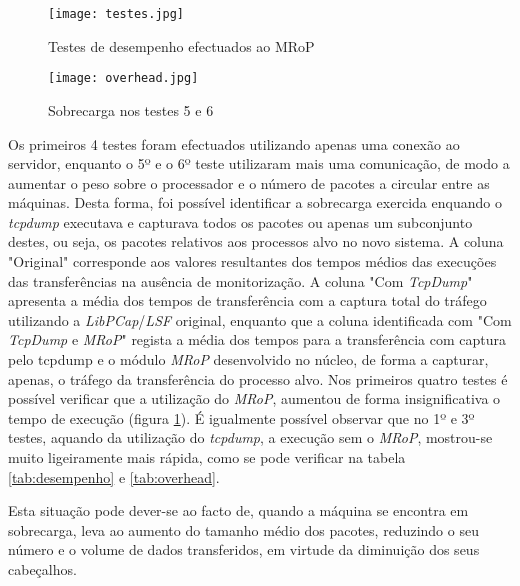 \begin{figure}[!ht]
\centering
\texttt{[image: testes.jpg]}
\caption{Testes de desempenho efectuados ao MRoP}
\label{fig:tests_graphics}
\end{figure}

\begin{figure}[!ht]
\centering
\texttt{[image: overhead.jpg]}
\caption{Sobrecarga nos testes 5 e 6 }
\label{fig:tests_overhead}
\end{figure}

Os primeiros 4 testes foram efectuados utilizando apenas uma conexão ao servidor, enquanto o 5º e o 6º teste utilizaram mais uma comunicação, de modo a aumentar o peso sobre o processador e o número de pacotes a circular entre as máquinas.
Desta forma, foi possível identificar a sobrecarga exercida enquando o \textit{tcpdump} executava e capturava todos os pacotes ou apenas um subconjunto destes, ou seja, os pacotes relativos aos processos alvo no novo sistema.
A coluna "Original" corresponde aos valores resultantes dos tempos médios das execuções das transferências na ausência de monitorização.
A coluna "Com \textit{TcpDump}" apresenta a média dos tempos de transferência com a captura total do tráfego utilizando a \textit{LibPCap}/\textit{LSF} original, enquanto que a coluna identificada com "Com \textit{TcpDump} e \textit{MRoP}" regista a média dos tempos para a transferência com captura pelo tcpdump e o módulo \textit{MRoP} desenvolvido no núcleo, de forma a capturar, apenas, o tráfego da transferência do processo alvo.
Nos primeiros quatro testes é possível verificar que a utilização do \textit{MRoP}, aumentou de forma insignificativa o tempo de execução (figura \ref{fig:tests_graphics}).
É igualmente possível observar que no 1º e 3º testes, aquando da utilização do \textit{tcpdump}, a execução sem o \textit{MRoP}, mostrou-se muito ligeiramente mais rápida, como se pode verificar na tabela \ref{tab:desempenho} e \ref{tab:overhead}.


Esta situação pode dever-se ao facto de, quando a máquina se encontra em sobrecarga, leva ao aumento do tamanho médio dos pacotes, reduzindo o seu número e o volume de dados transferidos, em virtude da diminuição dos seus cabeçalhos.

